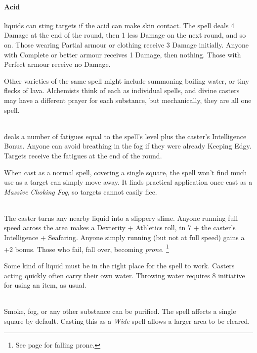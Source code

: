 \begin{multicols}{2}
\paragraph{Acid}
liquids can sting targets if the acid can make skin contact.
The spell deals 4 Damage at the end of the round, then 1 less Damage on the next round, and so on.
Those wearing Partial armour or clothing receive 3 Damage initially.
Anyone with Complete or better armour receives 1 Damage, then nothing.
Those with Perfect armour receive no Damage.

Other varieties of the same spell might include summoning boiling water, or tiny flecks of lava.
Alchemists think of each as individual spells, and divine casters may have a different prayer for each substance, but mechanically, they are all one spell.

\\
deals a number of \glspl{fatigue} equal to the spell's level plus the caster's Intelligence Bonus.
Anyone can avoid breathing in the fog if they were already Keeping Edgy.
Targets receive the \glspl{fatigue} at the end of the round.

When cast as a normal spell, covering a single square, the spell won't find much use as a target can simply move away.
It finds practical application once cast as a \textit{Massive Choking Fog}, so targets cannot easily flee.

\\
The caster turns any nearby liquid into a slippery slime.
Anyone running full speed across the area makes a Dexterity + Athletics roll, \gls{tn} 7 + the caster's Intelligence + Seafaring.
Anyone simply running (but not at full speed) gains a +2 bonus.
Those who fail, fall over, becoming \textit{prone}.%
\footnote{See page \pageref{prone} for falling prone.}

Some kind of liquid must be in the right place for the spell to work.
Casters acting quickly often carry their own water.
Throwing water requires 8 initiative for using an item, as usual.

\\
Smoke, fog, or any other substance can be purified.
The spell affects a single square by default.
Casting this as a \textit{Wide} spell allows a larger area to be cleared.


\end{multicols}
